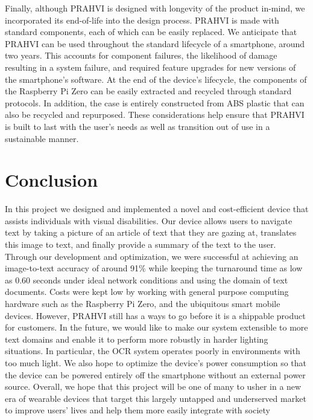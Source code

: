 	Finally, although PRAHVI is designed with longevity of the product in-mind, we incorporated its end-of-life into the design process. PRAHVI is made with standard components, each of which can be easily replaced. We anticipate that PRAHVI can be used throughout the standard lifecycle of a smartphone, around two years. This accounts for component failures, the likelihood of damage resulting in a system failure, and required feature upgrades for new versions of the smartphone's software. At the end of the device's lifecycle, the components of the Raspberry Pi Zero can be easily extracted and recycled through standard protocols. In addition, the case is entirely constructed from ABS plastic that can also be recycled and repurposed. These considerations help ensure that PRAHVI is built to last with the user's needs as well as transition out of use in a sustainable manner.

\chapter{Conclusion}
In this project we designed and implemented a novel and cost-efficient device that assists individuals with visual disabilities. Our device allows users to navigate text by taking a picture of an article of text that they are gazing at, translates this image to text, and finally provide a summary of the text to the user. Through our development and optimization, we were successful at achieving an image-to-text accuracy of around 91\% while keeping the turnaround time as low as 0.60 seconds under ideal network conditions and using the domain of text documents. Costs were kept low by working with general purpose computing hardware such as the Raspberry Pi Zero, and the ubiquitous smart mobile devices. However, PRAHVI still has a ways to go before it is a shippable product for customers. In the future, we would like to make our system extensible to more text domains and enable it to perform more robustly in harder lighting situations. In particular, the OCR system operates poorly in environments with too much light. We also hope to optimize the device's power consumption so that the device can be powered entirely off the smartphone without an external power source. Overall, we hope that this project will be one of many to usher in a new era of wearable devices that target this largely untapped and underserved market to improve users' lives and help them more easily integrate with society